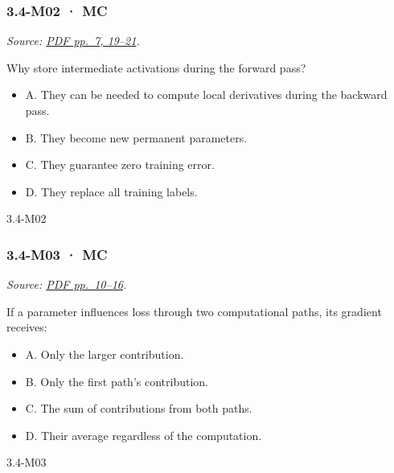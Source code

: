 \noindent\begin{minipage}{\linewidth}

\subsubsection{3.4-M02 · MC}\label{m02-mc-10}

\emph{Source:
\href{../Lecture\%20Slides/3.4.\%20Deep\%20Learning\%20Fundamentals\%20II.pdf\#page=7}{PDF
pp.~7, 19--21}.}

Why store intermediate activations during the forward pass?

\begin{itemize}
\tightlist
\item
  A. They can be needed to compute local derivatives during the backward
  pass.
\item
  B. They become new permanent parameters.
\item
  C. They guarantee zero training error.
\item
  D. They replace all training labels.
\end{itemize}

\begin{solution}[8mm]{3.4-M02}

\end{solution}
\end{minipage}\par\medskip

\noindent\begin{minipage}{\linewidth}

\subsubsection{3.4-M03 · MC}\label{m03-mc-10}

\emph{Source:
\href{../Lecture\%20Slides/3.4.\%20Deep\%20Learning\%20Fundamentals\%20II.pdf\#page=10}{PDF
pp.~10--16}.}

If a parameter influences loss through two computational paths, its
gradient receives:

\begin{itemize}
\tightlist
\item
  A. Only the larger contribution.
\item
  B. Only the first path's contribution.
\item
  C. The sum of contributions from both paths.
\item
  D. Their average regardless of the computation.
\end{itemize}

\begin{solution}[8mm]{3.4-M03}

\end{solution}
\end{minipage}\par\medskip

